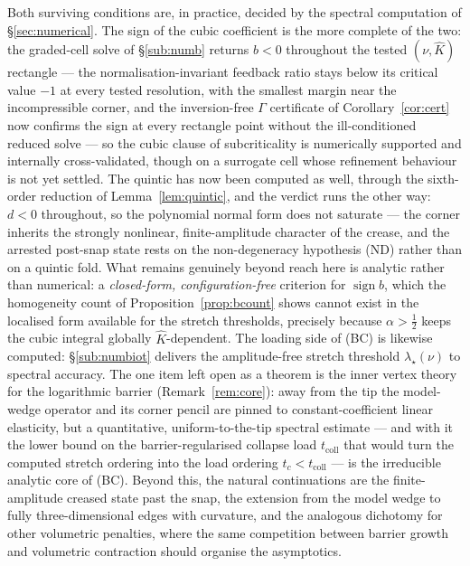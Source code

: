Both surviving conditions are, in practice, decided by the spectral computation of \S\ref{sec:numerical}. The sign of
the cubic coefficient is the more complete of the two: the graded-cell solve of \S\ref{sub:numb} returns
$b<0$ throughout the tested $(\nu,\hat K)$ rectangle --- the normalisation-invariant feedback ratio stays below
its critical value $-1$ at every tested resolution, with the smallest margin near the incompressible corner, and the
inversion-free $\Gamma$ certificate of Corollary~\ref{cor:cert} now confirms the sign at every rectangle point
without the ill-conditioned reduced solve --- so the cubic clause of subcriticality is numerically supported and
internally cross-validated, though on a surrogate cell whose refinement behaviour is not yet settled. The quintic has
now been computed as well, through the sixth-order reduction of Lemma~\ref{lem:quintic}, and the verdict runs the
other way: $d<0$ throughout, so the polynomial normal form does not saturate --- the corner inherits the strongly
nonlinear, finite-amplitude character of the crease, and the arrested post-snap state rests on the non-degeneracy
hypothesis (ND) rather than on a quintic fold. What remains genuinely beyond reach here is
analytic rather than numerical: a \emph{closed-form, configuration-free} criterion for $\operatorname{sign} b$, which the
homogeneity count of Proposition~\ref{prop:bcount} shows cannot exist in the localised form available for the stretch
thresholds, precisely because $\alpha>\tfrac12$ keeps the cubic integral globally $\hat K$-dependent. The loading side of
(BC) is likewise computed: \S\ref{sub:numbiot} delivers the amplitude-free stretch threshold $\lambda_\star(\nu)$ to
spectral accuracy. The one item left open as a theorem is the inner vertex theory for the logarithmic barrier
(Remark~\ref{rem:core}): away from the tip the model-wedge operator and its corner pencil are pinned to
constant-coefficient linear elasticity, but a quantitative, uniform-to-the-tip spectral estimate --- and with it the
lower bound on the barrier-regularised collapse load $t_{\mathrm{coll}}$ that would turn the computed stretch ordering
into the load ordering $t_c<t_{\mathrm{coll}}$ --- is the irreducible analytic core of (BC). Beyond this, the natural
continuations are the finite-amplitude creased state past the snap, the extension from the model wedge to fully
three-dimensional edges with curvature, and the analogous dichotomy for other volumetric penalties, where the same
competition between barrier growth and volumetric contraction should organise the asymptotics.
